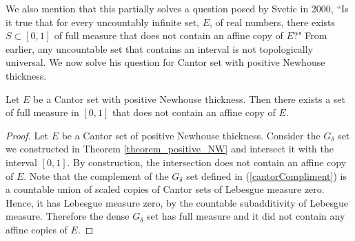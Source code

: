We also mention that this partially solves a question posed by Svetic\cite{Svetic} in 2000, ``Is it true that for every uncountably infinite set, $E$, of real numbers, there exists $S \subset [0,1]$ of full measure that does not contain an affine copy of $E$?"  From earlier, any uncountable set that contains an interval is not topologically universal. We now solve his question for Cantor set with positive Newhouse thickness. 
\begin{theorem}
    Let $E$ be a Cantor set with positive Newhouse thickness.  Then there exists a set of full measure in $[0,1]$ that does not contain an affine copy of $E$. 
\end{theorem}
\begin{proof}
    Let $E$ be a Cantor set of positive Newhouse thickness. Consider the $G_{\delta}$ set we constructed in Theorem \ref{theorem_positive_NW} and intersect it with the interval $[0,1]$.  By construction, the intersection does not contain an affine copy of $E$.   Note that the complement of the $G_\delta$ set defined in (\ref{cantorCompliment}) is a countable union of scaled copies of Cantor sets of Lebesgue measure zero. Hence, it has Lebesgue measure zero, by the countable subadditivity of Lebesgue measure.  Therefore the dense $G_{\delta}$ set  has full measure and it did not contain any affine copies of $E$.
\end{proof}




